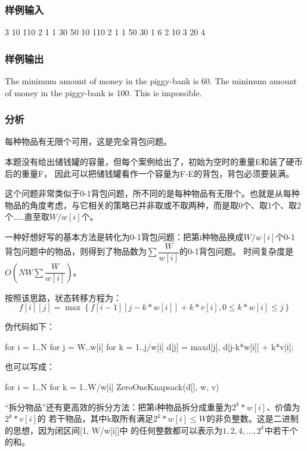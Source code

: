 \subsubsection{样例输入}
\begin{Code}
3
10 110
2
1 1
30 50
10 110
2
1 1
50 30
1 6
2
10 3
20 4
\end{Code}

\subsubsection{样例输出}
\begin{Code}
The minimum amount of money in the piggy-bank is 60.
The minimum amount of money in the piggy-bank is 100.
This is impossible.
\end{Code}

\subsubsection{分析}
每种物品有无限个可用，这是完全背包问题。

本题没有给出储钱罐的容量，但每个案例给出了，初始为空时的重量E和装了硬币后的重量F，
因此可以把储钱罐看作一个容量为F-E的背包，背包必须要装满。

这个问题非常类似于0-1背包问题，所不同的是每种物品有无限个。也就是从每种
物品的角度考虑，与它相关的策略已并非取或不取两种，而是取0个、取1个、取2
个……直至取$W/w[i]$个。

一种好想好写的基本方法是转化为0-1背包问题：把第i种物品换成$W/w[i]$个0-1
背包问题中的物品，则得到了物品数为$\sum \dfrac{W}{w[i]}$的0-1背包问题。
时间复杂度是$O(NW\sum \dfrac{W}{w[i]})$。

按照该思路，状态转移方程为：
$$f[i][j]=\max\left\{f[i-1][j-k*w[i]]+k*v[i], 0 \leq k*w[i] \leq j\right\}$$

伪代码如下：
\begin{Code}
for i = 1..N
    for j = W..w[i]
        for k = 1..j/w[i]
            d[j] = max{d[j], d[j-k*w[i]] + k*v[i]};
\end{Code}

也可以写成：
\begin{Code}
for i = 1..N
    for k = 1..W/w[i]
        ZeroOneKnapsack(d[], w, v)
\end{Code}

“拆分物品”还有更高效的拆分方法：把第i种物品拆分成重量为$2^k*w[i]$、价值为$2^k*v[i]$的
若干物品，其中k取所有满足$2^k*w[i] \leq W$的非负整数。这是二进制的思想，因为闭区间[1, W/w[i]]中
的任何整数都可以表示为$1, 2, 4, ..., 2^k$中若干个的和。

